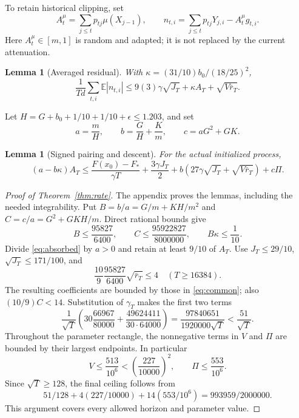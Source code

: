 \documentclass[11pt]{article}
\newtheorem{lemma}[theorem]{Lemma}
\newcommand{\E}{\mathbb E}
\begin{document}
To retain historical clipping, set
\[
 A_t^\mu=\sum_{j\le t}p_{tj}\mu(X_{j-1}),\qquad
 n_{t,i}=\sum_{j\le t}p_{tj}Y_{j,i}-A_t^\mu g_{t,i}.
\]
Here $A_t^\mu\in[m,1]$ is random and adapted; it is not replaced by the
current attenuation.
\begin{lemma}[Averaged residual]\label{lem:residual}
With $\kappa=(31/10)b_0/(18/25)^2$,
\[
 \frac1{Td}\sum_{t,i}\E|n_{t,i}|
 \le9(3)\gamma\sqrt{J_T}+\kappa A_T+\sqrt{V\bar r_T}.
\]
\end{lemma}

Let $H=G+b_0+1/10+1/10+\epsilon\le1.203$, and set
\[
 a=\frac mH,\qquad b=\frac GH+\frac Km,\qquad
 c=aG^2+GK .
\]
\begin{lemma}[Signed pairing and descent]\label{lem:pairing}
For the actual initialized process,
\begin{equation}\label{eq:absorbed}
 (a-b\kappa)A_T
 \le \frac{F(x_0)-F_*}{\gamma T}
       +\frac{3\gamma J_T}{2}
       +b\left(27\gamma\sqrt{J_T}+\sqrt{V\bar r_T}\right)
       +c\Pi .
\end{equation}
\end{lemma}

\begin{proof}[Proof of Theorem~\ref{thm:rate}]
The appendix proves the lemmas, including the needed integrability.
Put $B=b/a=G/m+KH/m^2$ and $C=c/a=G^2+GKH/m$.
Direct rational bounds give
\[
 B\le\frac{95827}{6400},\qquad
 C\le\frac{95922827}{8000000},\qquad B\kappa\le\frac1{10}.
\]
Divide \eqref{eq:absorbed} by $a>0$ and retain at least $9/10$ of $A_T$.
Use $J_T\le29/10$, $\sqrt{J_T}\le171/100$, and
\[
 \frac{10}{9}\frac{95827}{6400}\sqrt{\bar r_T}\le4
 \quad(T\ge16384).
\]
The resulting coefficients are bounded by those in \eqref{eq:common};
also $(10/9)C<14$. Substitution of $\gamma_T$ makes the first two terms
\[
 \frac1{\sqrt T}\left(
 30\frac{66967}{80000}+\frac{49624411}{30\cdot64000}\right)
 =\frac{97840651}{1920000\sqrt T}<\frac{51}{\sqrt T}.
\]
Throughout the parameter rectangle, the nonnegative terms in $V$ and $\Pi$
are bounded by their largest endpoints. In particular
\[
 V\le\frac{513}{10^6}<\left(\frac{227}{10000}\right)^2,\qquad
 \Pi\le\frac{553}{10^6}.
\]
Since $\sqrt T\ge128$, the final ceiling follows from
\[
 51/128+4(227/10000)+14(553/10^6)=993959/2000000.
\]
This argument covers every allowed horizon and parameter value.
\end{proof}
\end{document}
